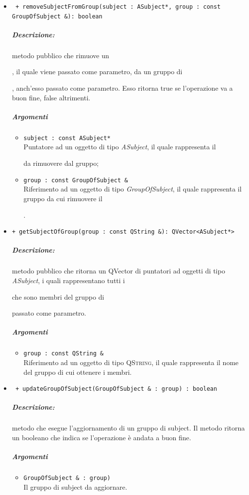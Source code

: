 \begin{itemize}
			\item \color{blue}\verb! + removeSubjectFromGroup(subject : ASubject*, group : const GroupOfSubject &): boolean!
			\color{black} 
			\subparagraph{Descrizione:} metodo pubblico che rimuove un \subject{}, il quale viene passato come parametro, da un gruppo di \subject{}, anch'esso passato come parametro. Esso ritorna true se l'operazione va a buon fine, false altrimenti.
			\subparagraph{Argomenti}
			\begin{itemize}
				\item \color{RoyalPurple}\verb!subject : const ASubject*! \\ 
				\color{black}Puntatore ad un oggetto di tipo \textsl{ASubject}, il quale rappresenta il \subject{} da rimuovere dal gruppo;
				
				\item \color{RoyalPurple}\verb!group : const GroupOfSubject &! \\ 
				\color{black}Riferimento ad un oggetto di tipo \textsl{GroupOfSubject}, il quale rappresenta il gruppo da cui rimuovere il \subject{}.
			\end{itemize}

			
			\item  \color{blue}\verb!+ getSubjectOfGroup(group : const QString &): QVector<ASubject*>!
			\color{black}
			\subparagraph{Descrizione:} metodo pubblico che ritorna un QVector di puntatori ad oggetti di tipo \textsl{ASubject}, i quali rappresentano tutti i \subject{} che sono membri del gruppo di \subject{} passato come parametro.
			\subparagraph{Argomenti}
			\begin{itemize}
				\item \color{RoyalPurple}\verb!group : const QString &! \\
				\color{black}Riferimento ad un oggetto di tipo \textsc{QString}, il quale rappresenta il nome del gruppo di cui ottenere i membri.
			\end{itemize}
			
			\item \color{blue}\verb! + updateGroupOfSubject(GroupOfSubject & : group) : boolean!\\
			\color{black}
			\subparagraph{Descrizione:} metodo che esegue l'aggiornamento di un gruppo di subject\g{}.
			Il metodo ritorna un booleano che indica se l'operazione è andata a buon fine.
			\subparagraph{Argomenti}
				\begin{itemize}
					\item \color{RoyalPurple}\verb!GroupOfSubject & : group)!\\
					\color{black}Il gruppo di subject\g{} da aggiornare.
				\end{itemize}

	\end{itemize}

